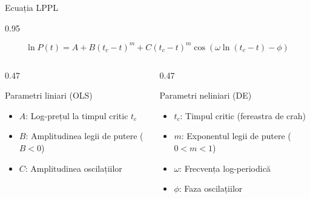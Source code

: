\documentclass[9pt, aspectratio=169, t]{beamer}
\begin{document}
\begin{frame}{Ecuația LPPL}
    \begin{cminipage}{0.95\textwidth}
    {\footnotesize
    \begin{center}
        \begin{minipage}{0.85\textwidth}
            \begin{block}{}
                \large
                $$\boxed{\ln P(t) = A + B(t_c - t)^m + C(t_c - t)^m \cos(\omega \ln(t_c - t) - \phi)}$$
            \end{block}
        \end{minipage}
    \end{center}

    \vspace{0.2cm}
    \begin{columns}[T]
        \begin{column}{0.47\textwidth}
            \begin{exampleblock}{Parametri liniari (OLS)}
                \begin{itemize}\setlength{\itemsep}{0pt}
                    \item $A$: Log-prețul la timpul critic $t_c$
                    \item $B$: Amplitudinea legii de putere ($B < 0$)
                    \item $C$: Amplitudinea oscilațiilor
                \end{itemize}
            \end{exampleblock}
        \end{column}
        \begin{column}{0.47\textwidth}
            \begin{alertblock}{Parametri neliniari (DE)}
                \begin{itemize}\setlength{\itemsep}{0pt}
                    \item $t_c$: Timpul critic (fereastra de crah)
                    \item $m$: Exponentul legii de putere ($0 < m < 1$)
                    \item $\omega$: Frecvența log-periodică
                    \item $\phi$: Faza oscilațiilor
                \end{itemize}
            \end{alertblock}
        \end{column}
    \end{columns}
    }
    \end{cminipage}
\end{frame}
\end{document}
